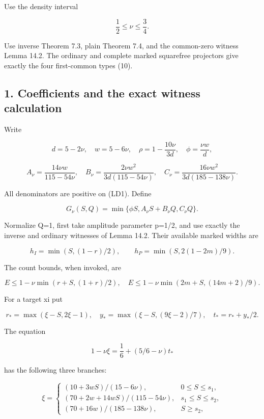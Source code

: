 Use the density interval

\[
                    \frac12\le\nu\le\frac34.             \tag{LD1}
\]

Use inverse Theorem 7.3, plain Theorem 7.4, and the common-zero witness Lemma 14.2. The ordinary and complete marked squarefree projectors give exactly the four first-common types (10).

\hypertarget{sources:coefficients-and-the-exact-witness-calculation}{%
\subsection{1. Coefficients and the exact witness calculation}\label{sources:coefficients-and-the-exact-witness-calculation}}

Write

\[
 d=5-2\nu,\quad w=5-6\nu,\quad
 \rho=1-\frac{10\nu}{3d},\quad \phi=\frac{\nu w}{d},
\]

\[
 A_\nu=\frac{14\nu w}{115-54\nu},\quad
 B_\nu=\frac{2\nu w^2}{3d(115-54\nu)},\quad
 C_\nu=\frac{16\nu w^2}{3d(185-138\nu)}.
\]

All denominators are positive on (LD1). Define

\[
 G_\nu(S,Q)=\min\{\phi S,A_\nu S+B_\nu Q,C_\nu Q\}.
                                                               \tag{LD2}
\]

Normalize Q=1, first take amplitude parameter p=1/2, and use exactly the inverse and ordinary witnesses of Lemma 14.2. Their available marked widths are

\[
 h_I=\min(S,(1-r)/2),\qquad
 h_P=\min(S,2(1-2m)/9).
\]

The count bounds, when invoked, are

\[
 E\le1-\nu\min(r+S,(1+r)/2),\quad
 E\le1-\nu\min(2m+S,(14m+2)/9).
\]

For a target xi put

\[
 r_*=\max(\xi-S,2\xi-1),\quad
 y_*=\max(\xi-S,(9\xi-2)/7),\quad
 t_*=r_*+y_*/2.
\]

The equation

\[
 1-\nu\xi=\frac16+(5/6-\nu)t_*                 \tag{LD3}
\]

has the following three branches:

\[
 \xi=\begin{cases}
 (10+3wS)/(15-6\nu),&0\le S\le s_1,\\
 (70+2w+14wS)/(115-54\nu),&s_1\le S\le s_2,\\
 (70+16w)/(185-138\nu),&S\ge s_2,
 \end{cases}
\]

